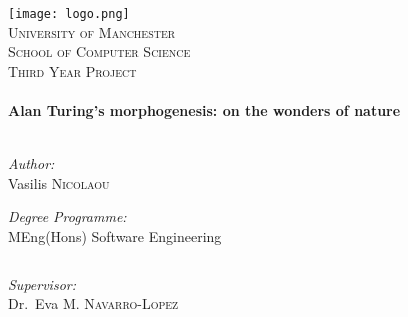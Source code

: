 \begin{titlepage}
\begin{center}

\texttt{[image: logo.png]}~\\[1cm]

\textsc{\LARGE University of Manchester}\\[1.5cm]

\textsc{\Large School of Computer Science}\\[0.5cm]

\textsc{\Large Third Year Project}\\[0.5cm]
\HRule \\[0.4cm]
{ \huge \bfseries Alan Turing's morphogenesis: on the wonders of nature}\\[0.4cm]

\HRule \\[1.5cm]


\begin{minipage}{0.4\textwidth}
\begin{flushleft} \large
\emph{Author:}\\
Vasilis \textsc{Nicolaou}
\end{flushleft}
\end{minipage}
\begin{minipage}{0.4\textwidth}
\begin{flushright}
{\large \emph{Degree Programme:}} \\MEng(Hons) Software Engineering
\end{flushright}
\end{minipage}
$$$$
$$$$
$$$$
\begin{center}
\emph{Supervisor:} \\
Dr.~Eva M. \textsc{Navarro-Lopez}
\end{center}

\vfill
{\mydate{\today}}

\end{center}
\end{titlepage}

